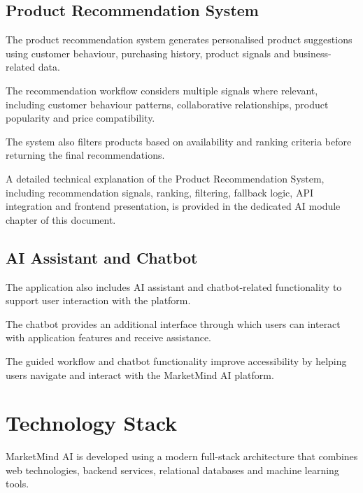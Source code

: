 \documentclass[12pt,a4paper]{report}
\begin{document}
\subsection{Product Recommendation System}

The product recommendation system generates personalised product
suggestions using customer behaviour, purchasing history, product
signals and business-related data.

The recommendation workflow considers multiple signals where relevant,
including customer behaviour patterns, collaborative relationships,
product popularity and price compatibility.

The system also filters products based on availability and ranking
criteria before returning the final recommendations.

A detailed technical explanation of the Product Recommendation System,
including recommendation signals, ranking, filtering, fallback logic,
API integration and frontend presentation, is provided in the dedicated
AI module chapter of this document.


\subsection{AI Assistant and Chatbot}

The application also includes AI assistant and chatbot-related
functionality to support user interaction with the platform.

The chatbot provides an additional interface through which users can
interact with application features and receive assistance.

The guided workflow and chatbot functionality improve accessibility by
helping users navigate and interact with the MarketMind AI platform.



\section{Technology Stack}

MarketMind AI is developed using a modern full-stack architecture that
combines web technologies, backend services, relational databases and
machine learning tools.
\end{document}
